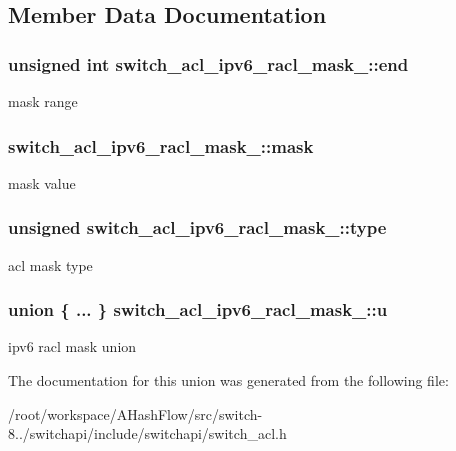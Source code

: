 \subsection{Member Data Documentation}
\hypertarget{unionswitch__acl__ipv6__racl__mask___a19ceeb8421ac22033cf31d82b6066679}{
\subsubsection[{end}]{\setlength{\rightskip}{0pt plus 5cm}unsigned int switch\+\_\+acl\+\_\+ipv6\+\_\+racl\+\_\+mask\+\_\+\+::end}}\label{unionswitch__acl__ipv6__racl__mask___a19ceeb8421ac22033cf31d82b6066679}
mask range \hypertarget{unionswitch__acl__ipv6__racl__mask___a44692bb352001ad1175bcf359efa9de7}{
\subsubsection[{mask}]{ switch\+\_\+acl\+\_\+ipv6\+\_\+racl\+\_\+mask\+\_\+\+::mask}}\label{unionswitch__acl__ipv6__racl__mask___a44692bb352001ad1175bcf359efa9de7}
mask value \hypertarget{unionswitch__acl__ipv6__racl__mask___a4d230c33ce9614b1b286c24965e80329}{
\subsubsection[{type}]{\setlength{\rightskip}{0pt plus 5cm}unsigned switch\+\_\+acl\+\_\+ipv6\+\_\+racl\+\_\+mask\+\_\+\+::type}}\label{unionswitch__acl__ipv6__racl__mask___a4d230c33ce9614b1b286c24965e80329}
acl mask type \hypertarget{unionswitch__acl__ipv6__racl__mask___ac8394eed560d3820f29ef4399e501d8a}{
\subsubsection[{u}]{\setlength{\rightskip}{0pt plus 5cm}union \{ ... \}   switch\+\_\+acl\+\_\+ipv6\+\_\+racl\+\_\+mask\+\_\+\+::u}}\label{unionswitch__acl__ipv6__racl__mask___ac8394eed560d3820f29ef4399e501d8a}
ipv6 racl mask union 

The documentation for this union was generated from the following file\+:\begin{DoxyCompactItemize}
\item 
/root/workspace/\+A\+Hash\+Flow/src/switch-\/8../switchapi/include/switchapi/switch\+\_\+acl.\+h\end{DoxyCompactItemize}

